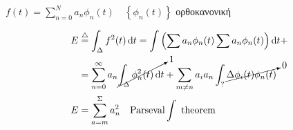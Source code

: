 \documentclass[11pt,a4paper,titlepage,fleqn]{article}
\begin{document}
    \( 
    f(t) = \sum_{n=0}^N a_n\phi_n(t) \quad \left\lbrace \phi_n(t) \right\rbrace
     \)  ορθοκανονική
     
     \begin{align*} E &\overset{\triangle}{=} \int_\Delta f^2(t)\dif t
     = \int\left(
     \sum a_n\phi_n(t)\sum a_n\phi_n(t)
     \right)\dif t+
     \\ &= \sum_{n=0}^\infty a_n\cancelto{1}{\int_\Delta \phi_n^2(t)\dif t} +
     \sum_{m\neq n}a_ia_n\int_?\cancelto{0}{\Delta\phi_i(t)\phi_n(t)} \\
     E &= \sum_{a=m}^\Sigma a_n^2 \quad \text{Parseval}\int \text{ theorem}
     \end{align*}

    
\end{document}
